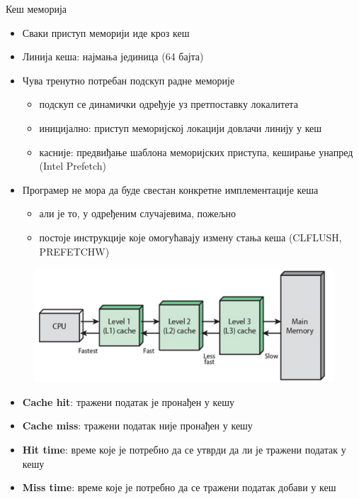 \documentclass[xcolor=table]{beamer}
\begin{document}
    \begin{frame}[allowframebreaks]{Кеш меморија}
        \begin{itemize}
            \item Сваки приступ меморији иде кроз кеш
            \item Линија кеша: најмања јединица (64 бајта)
            \item Чува тренутно потребан подскуп радне меморије
            \begin{itemize}
                \item подскуп се динамички одређује уз претпоставку локалитета
                \item иницијално: приступ меморијској локацији довлачи линију у кеш
                \item касније: предвиђање шаблона меморијских приступа, кеширање унапред (Intel Prefetch)
            \end{itemize}
            \item Програмер не мора да буде свестан конкретне имплементације кеша
            \begin{itemize}
                \item али је то, у одређеним случајевима, пожељно
                \item постоје инструкције које омогућавају измену стања кеша (CLFLUSH, PREFETCHW)
            \end{itemize}
        \end{itemize}
        
        \framebreak

        \begin{figure}
            \centering
            \includegraphics[width=\textwidth,height=\textheight,keepaspectratio]{images/mem2.jpg}
            \label{fig:mem2}
        \end{figure}
        
        \framebreak
        
        \begin{itemize}
            \item \textbf{Cache hit}: тражени податак је пронађен у кешу
            \item \textbf{Cache miss}: тражени податак није пронађен у кешу
            \item \textbf{Hit time}: време које је потребно да се утврди да ли је тражени податак у кешу
            \item \textbf{Miss time}: време које је потребно да се тражени податак добави у кеш
        \end{itemize}
    \end{frame}
    
\end{document}
